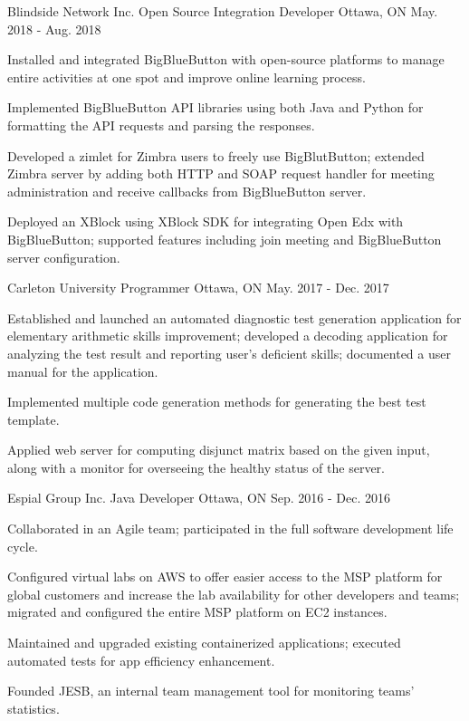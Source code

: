 \begin{cventries}

\cventry
{Blindside Network Inc.}
{Open Source Integration Developer}
{Ottawa, ON}
{May. 2018 - Aug. 2018}
{\begin{cvitems}
    \item {Installed and integrated BigBlueButton with open-source platforms to manage entire activities at one spot and improve online learning process.}
    \item {Implemented BigBlueButton API libraries using both Java and Python for formatting the API requests and parsing the responses.}
    \item {Developed a zimlet for Zimbra users to freely use BigBlutButton; extended Zimbra server by adding both HTTP and SOAP request handler for meeting administration and receive callbacks from BigBlueButton server.}
    \item {Deployed an XBlock using XBlock SDK for integrating Open Edx with BigBlueButton; supported features including join meeting and BigBlueButton server configuration.}
\end{cvitems}}

\cventry
{Carleton University}
{Programmer}
{Ottawa, ON}
{May. 2017 - Dec. 2017}
{\begin{cvitems}
    \item {Established and launched an automated diagnostic test generation application for elementary arithmetic skills improvement; developed a decoding application for analyzing the test result and reporting user's deficient skills; documented a user manual for the application.}
    \item {Implemented multiple code generation methods for generating the best test template.}
    \item {Applied web server for computing disjunct matrix based on the given input, along with a monitor for overseeing the healthy status of the server.}
\end{cvitems}}

\cventry
{Espial Group Inc.}
{Java Developer}
{Ottawa, ON}
{Sep. 2016 - Dec. 2016}
{\begin{cvitems}
    \item {Collaborated in an Agile team; participated in the full software development life cycle.}
    \item {Configured virtual labs on AWS to offer easier access to the MSP platform for global customers and increase the lab availability for other developers and teams; migrated and configured the entire MSP platform on EC2 instances.}
    \item {Maintained and upgraded existing containerized applications; executed automated tests for app efficiency enhancement.}
    \item {Founded JESB, an internal team management tool for monitoring teams' statistics.}
\end{cvitems}}


\end{cventries}
